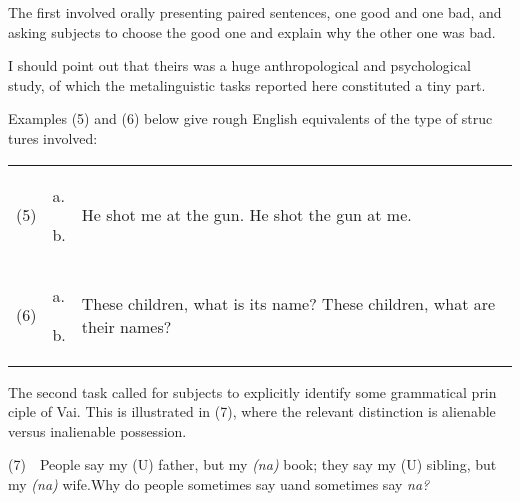 \begin{styleTextbody}
The first involved orally presenting paired sentences, one good and one bad, and asking subjects to choose the good one and explain why the other one was bad.
\end{styleTextbody}


\begin{listWWNumxxxviileveli}
\item 
\begin{styleStandard}
I should point out that theirs was a huge anthropological and psychological study, of which the metalinguistic tasks reported here constituted a tiny part.
\end{styleStandard}


\end{listWWNumxxxviileveli}
\clearpage\setcounter{page}{1}\begin{styleStandard}
Examples (5) and (6) below give rough English equivalents of the type of struc\- tures involved:
\end{styleStandard}


\begin{flushleft}
\tablehead{}
\begin{supertabular}{m{0.20255986in}m{0.22475985in}m{2.18096in}}
(5)

 &
a.

b.

 &
He shot me at the gun. He shot the gun at me.

\\
(6)

 &
a.

b.

 &
These children, what is its name? These children, what are their names?

\\
\end{supertabular}
\end{flushleft}
\begin{styleStandard}
The second task called for subjects to explicitly identify some grammatical prin\- ciple of Vai. This is illustrated in (7), where the relevant distinction is alienable versus inalienable possession.
\end{styleStandard}


\begin{styleStandard}
(7)\ \ People say {\textquotedbl}my (U) father,{\textquotedbl} but {\textquotedbl}my \textit{(na)}\textit{ }book{\textquotedbl}; they say {\textquotedbl}my (U) sibling,{\textquotedbl} but {\textquotedbl}my \textit{(na)}\textit{ }wife.{\textquotedbl}Why do people sometimes say uand sometimes say \textit{na?}
\end{styleStandard}


